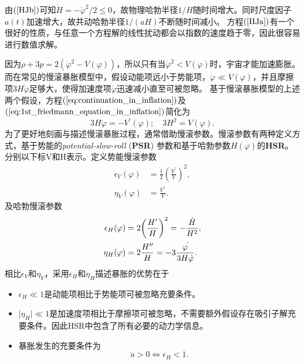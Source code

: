 由$(\ref{HJb})$可知$\dot H=-\dot \varphi^2/2\leq 0$，故物理哈勃半径$1/H$随时间增大。同时尺度因子$a(t)$加速增大，故共动哈勃半径$1/(aH)$不断随时间减小。
方程$(\ref{HJa})$有一个很好的性质，与任意一个方程解的线性扰动都会以指数的速度趋于零，因此很容易进行数值求解。

因为$\rho+3p=2{(\dot{\varphi}^2-V(\varphi))}$，所以只有当$\dot{\varphi}^2<V(\varphi)$时，宇宙才能加速膨胀。
而在常见的慢滚暴胀模型中，假设动能项远小于势能项，$\dot{\varphi}\ll
V(\varphi)$，并且摩擦项$3H\dot{\varphi}$足够大，使得加速度项$\ddot{\varphi}$迅速减小直至可被忽略。
基于慢滚暴胀模型的上述两个假设，方程$(\ref{eq:continuation_in_inflation})$及$(\ref{eq:1st_friedmann_equation_in_inflation})$简化为
\begin{equation}
  \label{eq:friedmann_equation_in_slow_roll_inflation}
  3H\dot{\varphi} = -V^\prime(\varphi);\quad 3H^2=V(\varphi).
\end{equation}
为了更好地刻画与描述慢滚暴胀过程，通常借助慢滚参数。慢滚参数有两种定义方式，基于势能的\textit{potential-slow-roll}
(\textbf{PSR}) 参数和基于哈勃参数$H(\varphi)$的\textbf{HSR}。
分别以下标V和H表示。定义势能慢滚参数
\begin{align}
  \label{eq:PSRA_epsilon}
  \epsilon_V(\varphi) &= \frac{1}{2} {\left(\frac{V^\prime}{V}\right)}^2,
  \\
  \label{eq:PSRA_eta}
  \eta_V(\varphi) &= \frac{V^{\dprime}}{V}.
\end{align}
及哈勃慢滚参数
\begin{align}
  \label{eq:HSRA_epsilon}
  \epsilon_H(\varphi) &= 2
  {\left(\frac{H^{\prime}}{H}\right)}^2=-\frac{\dot{H}}{H^2}, \\
  \label{eq:HSRA_eta}
  \eta_H(\varphi) &= 2 \frac{H^{\prime\prime}}{H}=-3
  \frac{\varphi^{\dot\dot}}{3H\dot{\varphi}}.
\end{align}
相比$\epsilon_V$和$\eta_V$，采用$\epsilon_H$和$\eta_H$描述暴胀的优势在于
\begin{itemize}
  \item $\epsilon_H\ll 1$是动能项相比于势能项可被忽略充要条件。\\
  \item $\lvert \eta_H\rvert \ll
    1$是加速度项相比于摩擦项可被忽略，不需要额外假设存在吸引子解充要条件。因此HSR中包含了所有必要的动力学信息。 \\
  \item 暴胀发生的充要条件为
    \begin{equation}
      \ddot{a} > 0 \Longleftrightarrow \epsilon_H < 1. 
    \end{equation}
\end{itemize}



